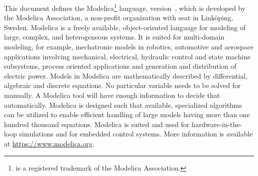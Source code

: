 \begin{center}
\large\bfseries\sffamily
\abstractname
\end{center}

This document defines the Modelica\footnote{%
 is a registered trademark of the Modelica Association.
}
language, version~\mlsversion, which is developed by the Modelica Association, a non-profit organization with seat in Linköping, Sweden.
Modelica is a freely available, object-oriented language for modeling of large, complex, and heterogeneous systems.
It is suited for multi-domain modeling, for example, mechatronic models in robotics, automotive and aerospace applications involving mechanical, electrical, hydraulic control and state machine subsystems, process oriented applications and generation and distribution of electric power.
Models in Modelica are mathematically described by differential, algebraic and discrete equations.
No particular variable needs to be solved for manually.
A Modelica tool will have enough information to decide that automatically.
Modelica is designed such that available, specialized algorithms can be utilized to enable efficient handling of large models having more than one hundred thousand equations.
Modelica is suited and used for hardware-in-the-loop simulations and for embedded control systems.
More information is available at \url{https://www.modelica.org}.
